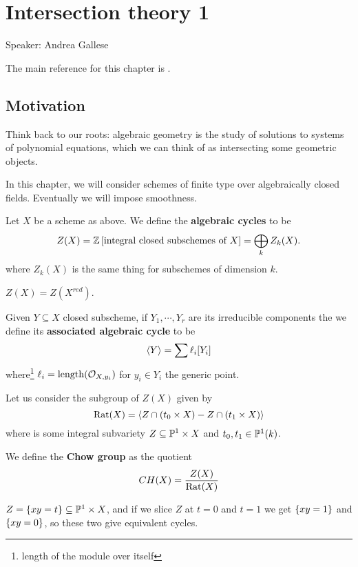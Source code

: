 \chapter{Intersection theory 1}
\begin{center}
	{\huge Speaker: Andrea Gallese}
\end{center}
\bigskip

\noindent
The main reference for this chapter is \cite{eisenbud20163264}.

\section{Motivation}

Think back to our roots: algebraic geometry is the study of solutions to systems of polynomial equations, which we can think of as intersecting some geometric objects.

In this chapter, we will consider schemes of finite type over algebraically closed fields. Eventually we will impose smoothness.

\begin{definition}[]
Let $X$ be a scheme as above. We define the \textbf{algebraic cycles} to be
\[Z(X)=\mathbb{Z}\left[{\text{integral closed subschemes of $X$}}\right]=\bigoplus_{k}Z_k(X).\]
where $Z_k(X)$ is the same thing for subschemes of dimension $k$.
\end{definition}

\begin{remark}
$Z(X)=Z(X^{red})$.
\end{remark}

\begin{definition}
Given $Y\subseteq X$ closed subscheme, if $Y_1,\cdots, Y_r$ are its irreducible components the we define its \textbf{associated algebraic cycle} to be
\[\left\langle {Y}\right\rangle=\sum \ell_i[Y_i]\]
where\footnote{length of the module over itself} $\ell_i=\operatorname{length}(\mathcal{O}_{X,y_i})$ for $y_i\in Y_i$ the generic point.
\end{definition}


\begin{definition}[]
Let us consider the subgroup of $Z(X)$ given by
\[\mathrm{Rat}(X)=\left\langle {Z\cap (t_0\times X)-Z\cap (t_1\times X)}\right\rangle\]
where is some integral subvariety $Z\subseteq \mathbb{P}^1\times X$ and $t_0,t_1\in \mathbb{P}^1(k)$.

We define the \textbf{Chow group} as the quotient
\[CH(X)=\frac{Z(X)}{\mathrm{Rat}(X)}\]
\end{definition}

\begin{example}
$Z=\left\{{xy=t}\right\}\subseteq \mathbb{P}^1\times X$, and if we slice $Z$ at $t=0$ and $t=1$ we get $\left\{{xy=1}\right\}$ and $\left\{{xy=0}\right\}$, so these two give equivalent cycles.
\end{example}


